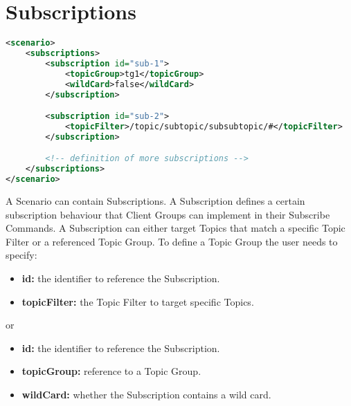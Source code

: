 \section{Subscriptions}
\begin{lstlisting}[caption={XMl definition of subscriptions}, captionpos=b, label={lst:subscriptions}, language=XML]
<scenario>
	<subscriptions>
		<subscription id="sub-1">
			<topicGroup>tg1</topicGroup>
			<wildCard>false</wildCard>
		</subscription>

		<subscription id="sub-2">
			<topicFilter>/topic/subtopic/subsubtopic/#</topicFilter>
		</subscription>

		<!-- definition of more subscriptions -->
	</subscriptions>
</scenario>
\end{lstlisting}
A Scenario can contain Subscriptions.
A Subscription defines a certain subscription behaviour that Client Groups can implement in their Subscribe Commands.
A Subscription can either target Topics that match a specific Topic Filter or a referenced Topic Group.
To define a Topic Group the user needs to specify:
\begin{itemize}
	\item \textbf{id:} the identifier to reference the Subscription.
	\item \textbf{topicFilter:} the Topic Filter to target specific Topics.
\end{itemize}
or
\begin{itemize}
	\item \textbf{id:} the identifier to reference the Subscription.
	\item \textbf{topicGroup:} reference to a Topic Group.
	\item \textbf{wildCard:} whether the Subscription contains a wild card. 
\end{itemize}

